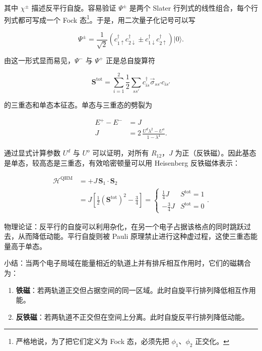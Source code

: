 其中 $\chi^{\pm}$ 描述反平行自旋。容易验证 $\Psi^{\pm}$ 是两个 Slater 行列式的线性组合，每个行列式都可写成一个 Fock 态\footnote{严格地说，为了把它们定义为 Fock 态，必须先把 $\phi_{1}$、$\phi_{2}$ 正交化。}。于是，用二次量子化记号可以写

\begin{equation*}
\Psi^ {\pm} = \frac {1}{\sqrt {2}} \left( c _ {1 \uparrow} ^ {\dagger} c _ {2 \downarrow} ^ {\dagger} \pm c _ {1 \downarrow} ^ {\dagger} c _ {2 \uparrow} ^ {\dagger} \right) | 0 \rangle .
\tag{2.24}
\end{equation*}

由这一形式显而易见，$\Psi^{-}$ 与 $\Psi^{+}$ 正是总自旋算符

\begin{equation*}
\mathbf {S} ^ {\mathrm{tot}} = \sum_ {i = 1} ^ {2} \frac {1}{2} \sum_ {ss'} c _ {is} ^ {\dagger} \vec {\sigma} _ {ss'} c _ {is'}
\tag{2.25}
\end{equation*}

的三重态和单态本征态。单态与三重态的劈裂为

\begin{align*}
E ^ {+} - E ^ {-} & = J\\
J & = 2 \, \frac {U ^ {d} \lambda^ {2} - U ^ {o}}{1 - \lambda^ {4}}.
\tag{2.26}
\end{align*}

通过显式计算参数 $U^{d}$ 与 $U^{o}$ 可以证明，对所有 $R_{12}$，$J$ 为正（反铁磁）。因此基态是单态，较高态是三重态，有效哈密顿量可以用 Heisenberg 反铁磁体表示：

\begin{align*}
\mathcal {H} ^ {\mathrm{QHM}} & = + J \, \mathbf {S} _ {1} \cdot \mathbf {S} _ {2}\\
& = J \left[ \frac {1}{2} (\mathbf {S} ^ {\mathrm{tot}}) ^ {2} - \frac {3}{4} \right] = \left\{ \begin{array}{ll} \frac {1}{4} J & S^{\mathrm{tot}} = 1 \\[2pt] - \frac {3}{4} J & S^{\mathrm{tot}} = 0 \end{array} \right. .
\tag{2.27}
\end{align*}

物理论证：反平行的自旋可以利用杂化，在另一个电子占据该格点的同时跳跃过去，从而降低动能。平行自旋则被 Pauli 原理禁止进行这种虚过程，这使三重态能量高于单态。

小结：当两个电子局域在能量相近的轨道上并有排斥相互作用时，它们的磁耦合为：

\begin{enumerate}[itemsep=1pt]
\item \textbf{铁磁}：若两轨道正交但占据空间的同一区域。此时自旋平行排列降低相互作用能。
\item \textbf{反铁磁}：若两轨道不正交但在空间上分离。此时自旋反平行排列降低动能。
\end{enumerate}

